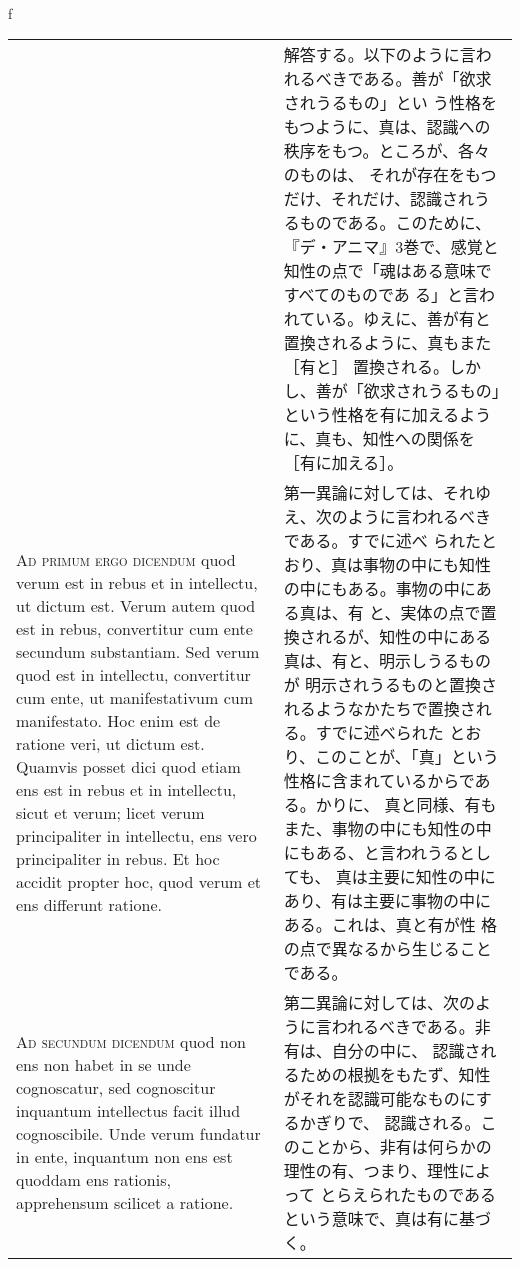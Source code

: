 \\f\documentclass[10pt]{jsarticle} %
\begin{document}
\begin{longtable}{p{21em}p{21em}}
&

解答する。以下のように言われるべきである。善が「欲求されうるもの」とい
う性格をもつように、真は、認識への秩序をもつ。ところが、各々のものは、
それが存在をもつだけ、それだけ、認識されうるものである。このために、
『デ・アニマ』3巻で、感覚と知性の点で「魂はある意味ですべてのものであ
る」と言われている。ゆえに、善が有と置換されるように、真もまた［有と］
置換される。しかし、善が「欲求されうるもの」という性格を有に加えるよう
に、真も、知性への関係を［有に加える］。

\\

{\scshape Ad primum ergo dicendum} quod verum est in rebus et in
intellectu, ut dictum est. Verum autem quod est in rebus, convertitur
cum ente secundum substantiam. Sed verum quod est in intellectu,
convertitur cum ente, ut manifestativum cum manifestato. Hoc enim est
de ratione veri, ut dictum est. Quamvis posset dici quod etiam ens est
in rebus et in intellectu, sicut et verum; licet verum principaliter
in intellectu, ens vero principaliter in rebus. Et hoc accidit propter
hoc, quod verum et ens differunt ratione.


&

第一異論に対しては、それゆえ、次のように言われるべきである。すでに述べ
られたとおり、真は事物の中にも知性の中にもある。事物の中にある真は、有
と、実体の点で置換されるが、知性の中にある真は、有と、明示しうるものが
明示されうるものと置換されるようなかたちで置換される。すでに述べられた
とおり、このことが、「真」という性格に含まれているからである。かりに、
真と同様、有もまた、事物の中にも知性の中にもある、と言われうるとしても、
真は主要に知性の中にあり、有は主要に事物の中にある。これは、真と有が性
格の点で異なるから生じることである。


\\


{\scshape Ad secundum dicendum} quod non ens non habet in se unde
cognoscatur, sed cognoscitur inquantum intellectus facit illud
cognoscibile. Unde verum fundatur in ente, inquantum non ens est
quoddam ens rationis, apprehensum scilicet a ratione.


&

第二異論に対しては、次のように言われるべきである。非有は、自分の中に、
認識されるための根拠をもたず、知性がそれを認識可能なものにするかぎりで、
認識される。このことから、非有は何らかの理性の有、つまり、理性によって
とらえられたものであるという意味で、真は有に基づく。

\\


\end{longtable}
\end{document}
